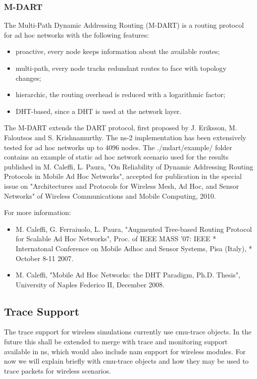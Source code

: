 \subsubsection{M-DART}
\label{sec:M-DART}

The Multi-Path Dynamic Addressing Routing (M-DART) is a routing protocol 
for ad hoc networks with the following features:
\begin{itemize}
\item proactive, every node keeps information about the available routes;
\item multi-path, every node tracks redundant routes to face with topology changes;
\item hierarchic, the routing overhead is reduced with a logarithmic factor;
\item DHT-based, since a DHT is used at the network layer.
\end{itemize}

The M-DART extends the DART protocol, first proposed by 
J. Eriksson, M. Faloutsos and S. Krishnamurthy.  The ns-2 
implementation has been extensively tested for ad hoc networks up to 
4096 nodes. The ./mdart/example/ folder contains an example of static 
ad hoc network scenario used for the results published in 
M. Caleffi, L. Paura, "On Reliability of Dynamic Addressing Routing 
Protocols in Mobile Ad Hoc Networks", accepted for publication in 
the special issue on "Architectures and Protocols for Wireless Mesh, Ad Hoc,
and Sensor Networks" of Wireless Communications and Mobile Computing, 2010.

For more information:
\begin{itemize}
\item M. Caleffi, G. Ferraiuolo, L. Paura, "Augmented Tree-based Routing  
Protocol for Scalable Ad Hoc Networks", Proc. of IEEE MASS '07: IEEE      *
Internatonal Conference on Mobile Adhoc and Sensor Systems, Pisa (Italy), *
October 8-11 2007. 
\item M. Caleffi, "Mobile Ad Hoc Networks: the DHT Paradigm, Ph.D. Thesis", 
University of Naples Federico II, December 2008. 
\end{itemize}

\subsection{Trace Support}
\label{sec:mobile-trace}

The trace support for wireless simulations currently use cmu-trace
objects. In the future this shall be extended to merge with trace and
monitoring support available in ns, which would also include nam support
for wireless modules. For now we will explain briefly with cmu-trace
objects and how they may be used to trace packets for wireless scenarios. 

